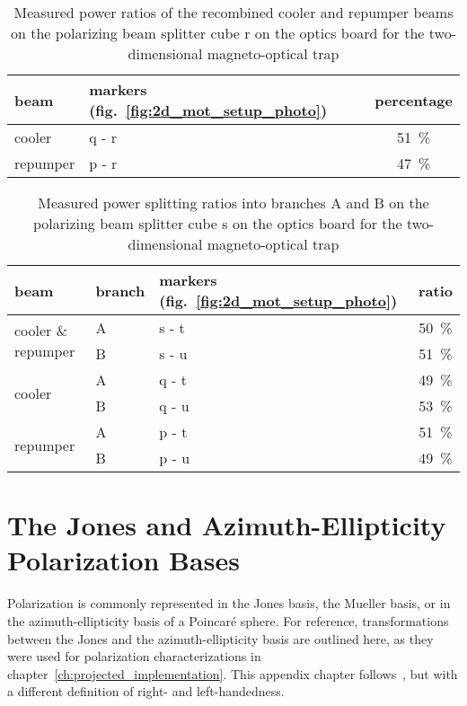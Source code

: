 \begin{table}[h]
    \centering
    \begin{tabular}{llc}
        \toprule
        \textbf{beam} & \textbf{markers} (fig.~\ref{fig:2d_mot_setup_photo}) & \textbf{percentage} \\
        \toprule
        cooler & q - r & \SI{51}{\percent} \\
        repumper & p - r & \SI{47}{\percent} \\
        \bottomrule
    \end{tabular}
    \caption{Measured power ratios of the recombined cooler and repumper beams on the polarizing beam splitter cube r on the optics board for the two-dimensional magneto-optical trap}
    \label{tab:power_recombination}
\end{table}

\begin{table}[h]
    \centering
    \begin{tabular}{lllc}
        \toprule
        \textbf{beam} & \textbf{branch} & \textbf{markers} (fig.~\ref{fig:2d_mot_setup_photo}) & \textbf{ratio} \\
        \toprule
        \multirow{2}{*}{cooler \& repumper} & A & s - t & \SI{50}{\percent} \\
        & B & s - u & \SI{51}{\percent} \\
        \midrule
        \multirow{2}{*}{cooler} & A & q - t & \SI{49}{\percent} \\
        & B & q - u & \SI{53}{\percent} \\
        \midrule
        \multirow{2}{*}{repumper} & A & p - t & \SI{51}{\percent} \\
        & B & p - u & \SI{49}{\percent} \\
        \bottomrule
    \end{tabular}
    \caption{Measured power splitting ratios into branches A and B on the polarizing beam splitter cube s on the optics board for the two-dimensional magneto-optical trap}
    \label{tab:power_splitting}
\end{table}



\chapter{The Jones and Azimuth-Ellipticity Polarization Bases}\label{ch:pypol_trafos}
Polarization is commonly represented in the Jones basis, the Mueller basis, or in the azimuth-ellipticity basis of a Poincaré sphere. For reference, transformations between the Jones and the azimuth-ellipticity basis are outlined here, as they were used for polarization characterizations in chapter~\ref{ch:projected_implementation}. This appendix chapter follows~\cite{trager_springer_2012}, but with a different definition of right- and left-handedness.

